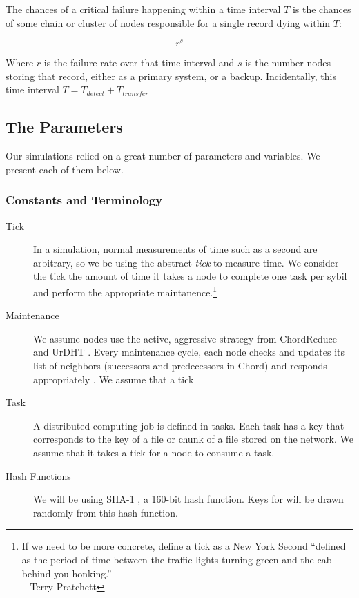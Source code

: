 The chances of a critical failure happening within a time interval $ T $ is the chances of some chain or cluster of nodes responsible for a single record dying within $ T $:

$$r^{s}$$

Where $ r $ is the failure rate over that time interval and $s$ is the number nodes storing that record, either as a primary system, or a backup.
Incidentally, this time interval $T = T_{detect} + T_{transfer} $



\subsection{The Parameters}

Our simulations relied on a great number of parameters and variables.
We present each of them below.

\subsubsection{Constants and Terminology}

\begin{description}
	\item [Tick] In a simulation, normal measurements of time such as a second are arbitrary, so we be using the abstract \textit{tick} to measure time.  
	We consider the tick the amount of time it takes a node to complete one task per sybil and perform the appropriate maintanence.\footnote{If we need to be more concrete, define a tick as a New York Second ``defined as the period of time between the traffic lights turning green and the cab behind you honking.''\\-- Terry Pratchett}
	\item [Maintenance] We assume nodes use the active, aggressive strategy from ChordReduce and  UrDHT \cite{chordreduce} \cite{urdht}.
	Every maintenance cycle, each node checks and updates its list of neighbors (successors and predecessors in Chord) and responds appropriately . 
	We assume that a tick
	\item [Task] A distributed computing job is defined in tasks.
	Each task has a key that corresponds to the key of a file or chunk of a file stored on the network.
	We assume that it takes a tick for a node to consume a task.
	\item [Hash Functions] We will be using SHA-1 \cite{sha1}, a 160-bit hash function.  
	Keys for  will be drawn randomly from this hash function.
\end{description}

